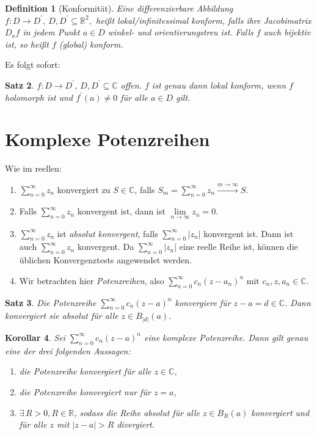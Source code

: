 \documentclass[a4paper,12pt]{book}
\theoremstyle{newthm}
\newtheorem{thm}{Satz}[section]
\newtheorem{cor}[thm]{Korollar}
\theoremstyle{newdef}
\newtheorem{defn}[thm]{Definition}
\theoremstyle{newrem}
\newcommand{\R}{\mathbb{R}}
\newcommand{\C}{\mathbb{C}}
\begin{document}
		\begin{defn}[Konformität]
			Eine differenzierbare Abbildung $ f:D \to D^\prime,\ D,D^\prime \subseteq \R^2, $ heißt \emph{lokal/infinitessimal konform}, falls ihre Jacobimatrix $ D_af $ in jedem Punkt $a \in D$ winkel- und orientierungstreu ist. Falls $f$ auch bijektiv ist, so heißt $f$ \emph{(global) konform}.
		\end{defn}
		
		Es folgt sofort:
		\begin{thm}
			$f: D \to D^\prime,\ D,D^\prime \subseteq \C$ offen. $f$ ist genau dann lokal konform, wenn $f$ holomorph ist und $f^\prime(a) \neq 0$ für alle $a \in D$ gilt.
		\end{thm}
		
	
	\section{Komplexe Potenzreihen}
		
		Wie im reellen:
		\begin{enumerate}
			\item $ \sum\limits_{n=0}^\infty z_n $ konvergiert zu $S \in \C$, falls $ S_m = \sum\limits_{n=0}^\infty z_n \overset{m \to \infty}{\longrightarrow} S. $
			\item Falls $\sum\limits_{n=0}^\infty z_n $ konvergent ist, dann ist $ \lim\limits_{n \to \infty} z_n = 0. $
			\item  $\sum\limits_{n=0}^\infty z_n $ ist \emph{absolut konvergent}, falls $\sum\limits_{n=0}^\infty |z_n| $ konvergent ist. Dann ist auch $ \sum\limits_{n=0}^\infty z_n $ konvergent. Da $\sum\limits_{n=0}^\infty |z_n| $ eine reelle Reihe ist, können die üblichen Konvergenztests angewendet werden.
			\item Wir betrachten hier \emph{Potenzreihen}, also $\sum\limits_{n=0}^\infty c_n (z-a_n)^n $ mit $ c_n, z, a_n \in \C. $
		\end{enumerate}
		
		\begin{thm}
			Die Potenzreihe $ \sum\limits_{n=0}^\infty c_n (z-a)^n $ konvergiere für $ z-a = d \in \C $. Dann konvergiert sie absolut für alle $ z \in B_{|d|}(a) $.
		\end{thm}
		
		\begin{cor}\label{cor_pot}
			Sei $ \sum\limits_{n=0}^\infty c_n (z-a)^n $ eine komplexe Potenzreihe. Dann gilt genau eine der drei folgenden Aussagen:
			\begin{enumerate}[label={\roman*})]
				\item die Potenzreihe konvergiert für alle $z \in \C$,
				\item die Potenzreihe konvergiert nur für $z = a$,
				\item $ \exists\, R > 0, R \in \R $, sodass die Reihe absolut für alle $z \in B_R(a)$ konvergiert und für alle $ z $ mit $ |z-a|>R $ divergiert.
			\end{enumerate}
		\end{cor}
		
\end{document}
